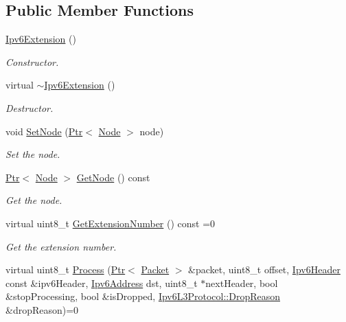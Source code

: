 \subsection*{Public Member Functions}
\begin{DoxyCompactItemize}
\item 
\hyperlink{classns3_1_1Ipv6Extension_a80f41b66e74fbe9c43c0904dd5593aab}{Ipv6\+Extension} ()
\begin{DoxyCompactList}\small\item\em Constructor. \end{DoxyCompactList}\item 
virtual \hyperlink{classns3_1_1Ipv6Extension_ac125b2ede0af3b1d744cd36fde4e5a2f}{$\sim$\+Ipv6\+Extension} ()
\begin{DoxyCompactList}\small\item\em Destructor. \end{DoxyCompactList}\item 
void \hyperlink{classns3_1_1Ipv6Extension_a4dc5ccf549425b8d7c70ff790b2b0401}{Set\+Node} (\hyperlink{classns3_1_1Ptr}{Ptr}$<$ \hyperlink{classns3_1_1Node}{Node} $>$ node)
\begin{DoxyCompactList}\small\item\em Set the node. \end{DoxyCompactList}\item 
\hyperlink{classns3_1_1Ptr}{Ptr}$<$ \hyperlink{classns3_1_1Node}{Node} $>$ \hyperlink{classns3_1_1Ipv6Extension_a71cc2e202ef7605b1f645d8c6a384657}{Get\+Node} () const 
\begin{DoxyCompactList}\small\item\em Get the node. \end{DoxyCompactList}\item 
virtual uint8\+\_\+t \hyperlink{classns3_1_1Ipv6Extension_a293ec615901976f850085116ec882eb7}{Get\+Extension\+Number} () const =0
\begin{DoxyCompactList}\small\item\em Get the extension number. \end{DoxyCompactList}\item 
virtual uint8\+\_\+t \hyperlink{classns3_1_1Ipv6Extension_a5946bc5e6fa07b76e2dcb7e4dee01f9f}{Process} (\hyperlink{classns3_1_1Ptr}{Ptr}$<$ \hyperlink{classns3_1_1Packet}{Packet} $>$ \&packet, uint8\+\_\+t offset, \hyperlink{classns3_1_1Ipv6Header}{Ipv6\+Header} const \&ipv6\+Header, \hyperlink{classns3_1_1Ipv6Address}{Ipv6\+Address} dst, uint8\+\_\+t $\ast$next\+Header, bool \&stop\+Processing, bool \&is\+Dropped, \hyperlink{classns3_1_1Ipv6L3Protocol_a33c64db9bc35f71ff368b132bfffa37a}{Ipv6\+L3\+Protocol\+::\+Drop\+Reason} \&drop\+Reason)=0

\end{DoxyCompactItemize}
